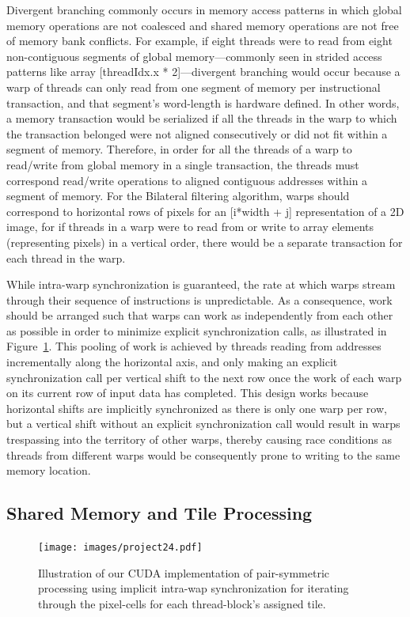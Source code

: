 \documentclass{IEEEtran}
\begin{document}
Divergent branching commonly occurs in memory access patterns in which global memory operations are not coalesced and shared memory operations are not free of memory bank conflicts. For example, if eight threads were to read from eight non-contiguous segments of global memory---commonly seen in strided access patterns like array {[}threadIdx.x {*} 2{]}---divergent branching would occur because a warp of threads can only read from one segment of memory per instructional transaction, and that segment's word-length is hardware defined. In other words, a memory transaction would be serialized if all the threads in the warp to which the transaction belonged were not aligned consecutively or did not fit within a segment of memory. Therefore, in order for all the threads of a warp to read/write from global memory in a single transaction, the threads must correspond read/write operations to aligned contiguous addresses within a segment of memory. For the Bilateral filtering algorithm, warps should correspond to horizontal rows of pixels for an [i*width + j] representation of a 2D image, for if threads in a warp were to read from or write to array elements (representing pixels) in a vertical order, there would be a separate transaction for each thread in the warp.

While intra-warp synchronization is guaranteed, the rate at which warps stream through their sequence of instructions is unpredictable. As a consequence, work should be arranged such that warps can work as independently from each other as possible in order to minimize explicit synchronization calls, as illustrated in Figure~\ref{fig:pspro}. This pooling of work is achieved by threads reading from addresses incrementally along the horizontal axis, and only making an explicit synchronization call per vertical shift to the next row once the work of each warp on its current row of input data has completed. This design works because horizontal shifts are implicitly synchronized as there is only one warp per row, but a vertical shift without an explicit synchronization call would result in warps trespassing into the territory of other warps, thereby causing race conditions as threads from different warps would be consequently prone to writing to the same memory location. 

\subsection{Shared Memory and Tile Processing}
\begin{figure}
\texttt{[image: images/project24.pdf]}
\caption{Illustration of our CUDA implementation of pair-symmetric processing using implicit intra-wap synchronization for iterating through the pixel-cells for each thread-block's assigned tile.}
\label{fig:pspro}
\end{figure}
\end{document}
